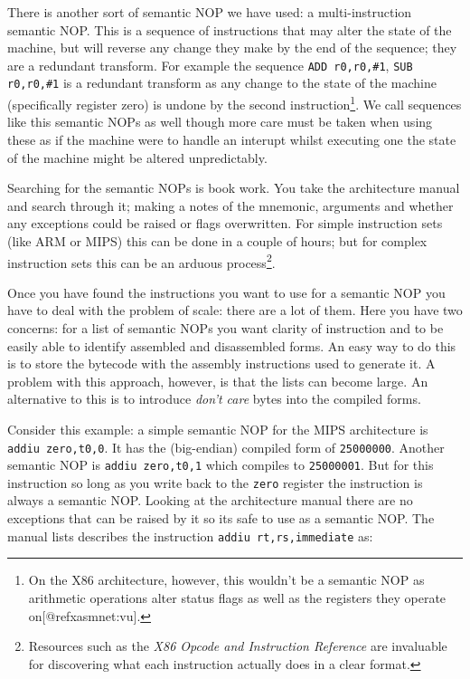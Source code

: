 \documentclass[12pt,]{book}
\begin{document}
There is another sort of semantic NOP we have used: a multi-instruction
semantic NOP. This is a sequence of instructions that may alter the
state of the machine, but will reverse any change they make by the end
of the sequence; they are a redundant transform. For example the
sequence \lstinline!ADD r0,r0,#1!, \lstinline!SUB r0,r0,#1! is a
redundant transform as any change to the state of the machine
(specifically register zero) is undone by the second
instruction\footnote{On the X86
  architecture\autocite{IntelCorporation:1997ta}, however, this wouldn't
  be a semantic NOP as arithmetic operations alter status flags as well
  as the registers they operate on{[}@refxasmnet:vu{]}.}. We call
sequences like this semantic NOPs as well though more care must be taken
when using these as if the machine were to handle an interupt whilst
executing one the state of the machine might be altered unpredictably.

Searching for the semantic NOPs is book work. You take the architecture
manual and search through it; making a notes of the mnemonic, arguments
and whether any exceptions could be raised or flags overwritten. For
simple instruction sets (like ARM or MIPS) this can be done in a couple
of hours; but for complex instruction sets this can be an arduous
process\footnote{Resources such as the \emph{X86 Opcode and Instruction
  Reference} \autocite{refx86} are invaluable for discovering what each
  instruction actually does in a clear format.}.

Once you have found the instructions you want to use for a semantic NOP
you have to deal with the problem of scale: there are a lot of them.
Here you have two concerns: for a list of semantic NOPs you want clarity
of instruction and to be easily able to identify assembled and
disassembled forms. An easy way to do this is to store the bytecode with
the assembly instructions used to generate it. A problem with this
approach, however, is that the lists can become large. An alternative to
this is to introduce \emph{don't care} bytes into the compiled forms.

Consider this example: a simple semantic NOP for the MIPS architecture
is \lstinline!addiu zero,t0,0!. It has the (big-endian) compiled form of
\lstinline!25000000!. Another semantic NOP is
\lstinline!addiu zero,t0,1! which compiles to \lstinline!25000001!. But
for this instruction so long as you write back to the \lstinline!zero!
register the instruction is always a semantic NOP. Looking at the
architecture manual\autocite{MIPSTechnologiesInc:2011ta} there are no
exceptions that can be raised by it so its safe to use as a semantic
NOP. The manual lists describes the instruction
\lstinline!addiu rt,rs,immediate! as:
\end{document}

